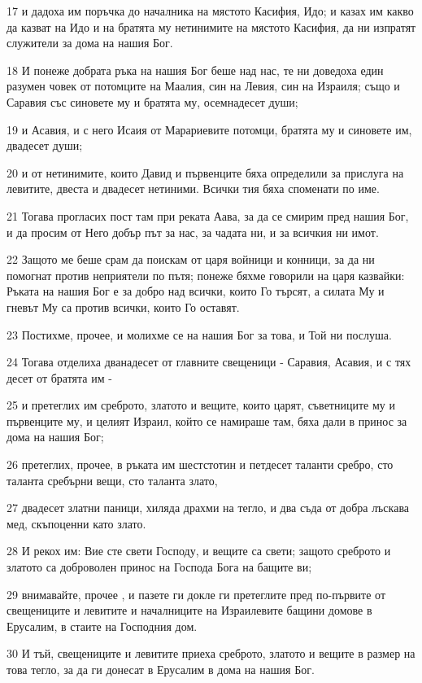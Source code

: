 \par 17 и дадоха им поръчка до началника на мястото Касифия, Идо; и казах им какво да казват на Идо и на братята му нетинимите на мястото Касифия, да ни изпратят служители за дома на нашия Бог.
\par 18 И понеже добрата ръка на нашия Бог беше над нас, те ни доведоха един разумен човек от потомците на Маалия, син на Левия, син на Израиля; също и Саравия със синовете му и братята му, осемнадесет души;
\par 19 и Асавия, и с него Исаия от Марариевите потомци, братята му и синовете им, двадесет души;
\par 20 и от нетинимите, които Давид и първенците бяха определили за прислуга на левитите, двеста и двадесет нетиними. Всички тия бяха споменати по име.
\par 21 Тогава прогласих пост там при реката Аава, за да се смирим пред нашия Бог, и да просим от Него добър път за нас, за чадата ни, и за всичкия ни имот.
\par 22 Защото ме беше срам да поискам от царя войници и конници, за да ни помогнат против неприятели по пътя; понеже бяхме говорили на царя казвайки: Ръката на нашия Бог е за добро над всички, които Го търсят, а силата Му и гневът Му са против всички, които Го оставят.
\par 23 Постихме, прочее, и молихме се на нашия Бог за това, и Той ни послуша.
\par 24 Тогава отделиха дванадесет от главните свещеници - Саравия, Асавия, и с тях десет от братята им -
\par 25 и претеглих им среброто, златото и вещите, които царят, съветниците му и първенците му, и целият Израил, който се намираше там, бяха дали в принос за дома на нашия Бог;
\par 26 претеглих, прочее, в ръката им шестстотин и петдесет таланти сребро, сто таланта сребърни вещи, сто таланта злато,
\par 27 двадесет златни паници, хиляда драхми на тегло, и два съда от добра лъскава мед, скъпоценни като злато.
\par 28 И рекох им: Вие сте свети Господу, и вещите са свети; защото среброто и златото са доброволен принос на Господа Бога на бащите ви;
\par 29 внимавайте, прочее , и пазете ги докле ги претеглите пред по-първите от свещениците и левитите и началниците на Израилевите бащини домове в Ерусалим, в стаите на Господния дом.
\par 30 И тъй, свещениците и левитите приеха среброто, златото и вещите в размер на това тегло, за да ги донесат в Ерусалим в дома на нашия Бог.
